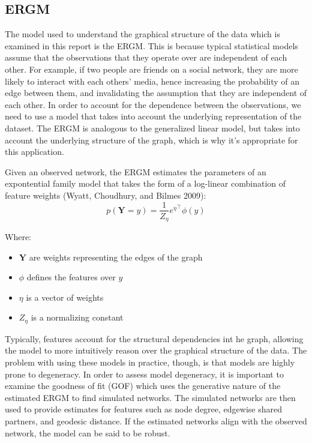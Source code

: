 \documentclass[
]{article}
\providecommand{\tightlist}{%
  \setlength{\itemsep}{0pt}\setlength{\parskip}{0pt}}
\begin{document}
\hypertarget{ergm}{%
\subsection{ERGM}\label{ergm}}

The model used to understand the graphical structure of the data which is examined in this report is the ERGM. This is because typical statistical models assume that the observations that they operate over are independent of each other. For example, if two people are friends on a social network, they are more likely to interact with each others' media, hence increasing the probability of an edge between them, and invalidating the assumption that they are independent of each other. In order to account for the dependence between the observations, we need to use a model that takes into account the underlying representation of the dataset. The ERGM is analogous to the generalized linear model, but takes into account the underlying structure of the graph, which is why it's appropriate for this application.

Given an observed network, the ERGM estimates the parameters of an expontential family model that takes the form of a log-linear combination of feature weights (Wyatt, Choudhury, and Bilmes 2009): \[
p(\mathbf{Y}=y)=\frac{1}{Z_\eta}{e^\eta}^\top\phi(y)
\]

Where:

\begin{itemize}
\tightlist
\item
  \(\mathbf{Y}\) are weights representing the edges of the graph
\item
  \(\phi\) defines the features over \(y\)
\item
  \(\eta\) is a vector of weights
\item
  \(Z_\eta\) is a normalizing constant
\end{itemize}

Typically, features account for the structural dependencies int he graph, allowing the model to more intuitively reason over the graphical structure of the data. The problem with using these models in practice, though, is that models are highly prone to degeneracy. In order to assess model degeneracy, it is important to examine the goodness of fit (GOF) which uses the generative nature of the estimated ERGM to find simulated networks. The simulated networks are then used to provide estimates for features such as node degree, edgewise shared partners, and geodesic distance. If the estimated networks align with the observed network, the model can be said to be robust.
\end{document}

